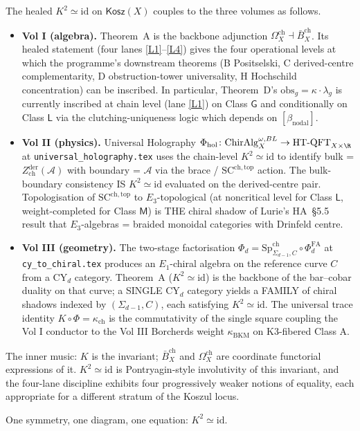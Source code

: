 \documentclass[11pt]{article}
\theoremstyle{definition}
\newcommand{\Bbarch}{\bar B^{\mathrm{ch}}}
\newcommand{\Omegach}{\Omega^{\mathrm{ch}}}
\newcommand{\Kosz}{\mathsf{Kosz}}
\newcommand{\id}{\mathrm{id}}
\newcommand{\cA}{\mathcal{A}}
\begin{document}
The healed $K^{2}\simeq\id$ on $\Kosz(X)$ couples to the three
volumes as follows.

\begin{itemize}
\item \textbf{Vol I (algebra).} Theorem~A is the backbone adjunction
$\Omegach_X\dashv\Bbarch_X$. Its healed statement (four lanes
\ref{L1}--\ref{L4}) gives the four operational levels at which the
programme's downstream theorems (B Positselski, C derived-centre
complementarity, D obstruction-tower universality, H Hochschild
concentration) can be inscribed. In particular, Theorem~D's
$\mathrm{obs}_g=\kappa\cdot\lambda_g$ is currently inscribed at
chain level (lane \ref{L1}) on Class $\mathsf{G}$ and conditionally
on Class $\mathsf{L}$ via the clutching-uniqueness logic which
depends on $[\beta_{\mathrm{nodal}}]$.
\item \textbf{Vol II (physics).} Universal Holography
$\Phi_{\mathrm{hol}}\colon\mathrm{ChirAlg}^{\omega,BL}_X\to\mathrm{HT\text{-}QFT}_{X\times\R}$
at \texttt{universal\_holography.tex} uses the chain-level
$K^{2}\simeq\id$ to identify bulk = $Z^{\mathrm{der}}_{\mathrm{ch}}(\cA)$
with boundary = $\cA$ via the brace / $\mathrm{SC}^{\mathrm{ch,top}}$
action. The bulk-boundary consistency IS $K^{2}\simeq\id$
evaluated on the derived-centre pair. Topologisation of
$\mathrm{SC}^{\mathrm{ch,top}}$ to $E_3$-topological (at
noncritical level for Class $\mathsf{L}$, weight-completed for
Class $\mathsf{M}$) is THE chiral shadow of Lurie's
HA~\S5.5 result that $E_3$-algebras = braided monoidal categories
with Drinfeld centre.
\item \textbf{Vol III (geometry).} The two-stage factorisation
$\Phi_d=\mathrm{Sp}^{\mathrm{ch}}_{\Sigma_{d-1},C}\circ\Phi^{\mathrm{FA}}_d$
at \texttt{cy\_to\_chiral.tex} produces an $E_1$-chiral algebra on
the reference curve $C$ from a CY$_d$ category. Theorem~A
($K^{2}\simeq\id$) is the backbone of the bar--cobar duality on
that curve; a SINGLE CY$_d$ category yields a FAMILY of chiral
shadows indexed by $(\Sigma_{d-1},C)$, each satisfying
$K^{2}\simeq\id$. The universal trace identity
$K\circ\Phi=\kappa_{\mathrm{ch}}$ is the commutativity of the
single square coupling the Vol I conductor to the Vol III
Borcherds weight $\kappa_{\mathrm{BKM}}$ on K3-fibered Class A.
\end{itemize}

The inner music: $K$ is the invariant; $\Bbarch_X$ and
$\Omegach_X$ are coordinate functorial expressions of it.
$K^{2}\simeq\id$ is Pontryagin-style involutivity of this
invariant, and the four-lane discipline exhibits four
progressively weaker notions of equality, each appropriate
for a different stratum of the Koszul locus.

One symmetry, one diagram, one equation: $K^{2}\simeq\id$.
\end{document}
